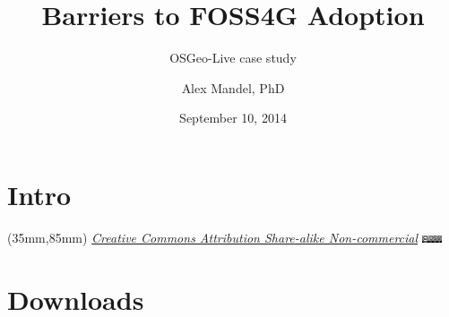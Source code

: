 \documentclass{beamer}
\title[PDFTitle]{Barriers to FOSS4G Adoption}
\subtitle[Sub]{OSGeo-Live case study}
\author[A. Mandel]{Alex Mandel, PhD} %
\institute[UCD]{
  Geography Graduate Group\\
  University of California, Davis\\
  \texttt{aimandel@ucdavis.edu}\\
  @aimandel
}
\date[Sep 2014]{September 10, 2014}
\newenvironment{reference}[2]{%
  \begin{textblock*}{\textwidth}(#1,#2) 
      \footnotesize\it\bgroup\color{black}}{\egroup\end{textblock*}}
\begin{document}
\section{Intro}
\begin{frame}[plain]
  \titlepage
   \begin{reference}{35mm}{85mm}
		\tiny \href{http://creativecommons.org/licenses/by-nc-sa/3.0/}{Creative Commons Attribution Share-alike Non-commercial}
		\includegraphics[width=22px]{cc-a-nc-sa-88x31.png}
   \end{reference} 
\end{frame}


\section{Downloads}
\end{document}
